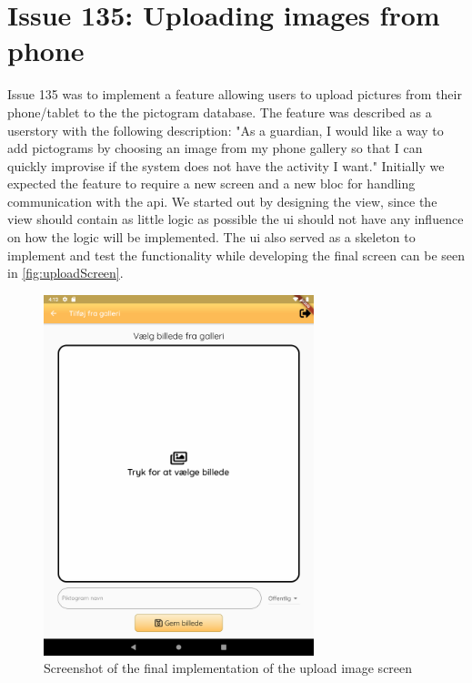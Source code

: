 \section{Issue 135: Uploading images from phone}

Issue 135 was to implement a feature allowing users to upload pictures from their phone/tablet to the the pictogram database. The feature was described as a userstory with the following description: "As a guardian, I would like a way to add pictograms by choosing an image from my phone gallery so that I can quickly improvise if the system does not have the activity I want." 
Initially we expected the feature to require a new screen and a new \gls{bloc} for handling communication with the api. We started out by designing the view, since the view should contain as little logic as possible the \gls{ui} should not have any influence on how the logic will be implemented. The \gls{ui} also served as a skeleton to implement and test the functionality while developing the final screen can be seen in \autoref{fig:uploadScreen}.

\begin{figure}[!h]
  \centering
  \includegraphics[width=0.7\textwidth]{figures/uploadPictogramScreen.png}
  \caption{Screenshot of the final implementation of the upload image screen}
  \label{fig:uploadScreen}
\end{figure}

